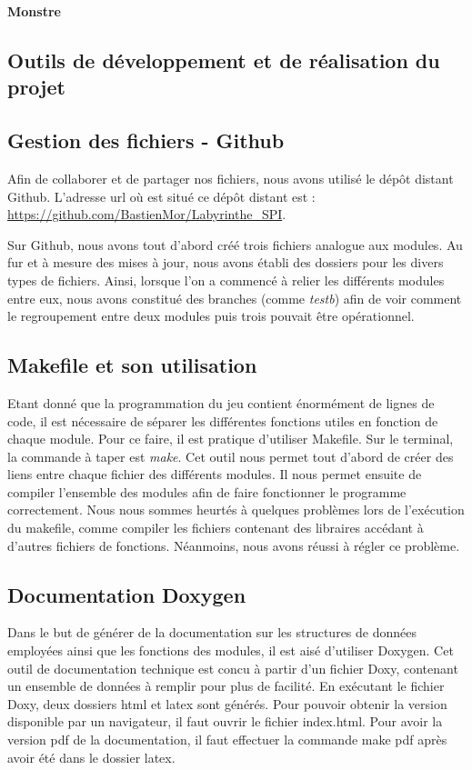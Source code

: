\documentclass[a4paper,11pt]{report}
\begin{document}
  		    \textbf{Monstre}
   		\begin{itemize}

  \chapter{Outils de développement et de réalisation du projet}
  \section{Gestion des fichiers - Github}
  Afin de collaborer et de partager nos fichiers, nous avons utilisé le dépôt distant Github. L'adresse url où est situé ce dépôt distant est : \url{https://github.com/BastienMor/Labyrinthe_SPI}.
  
  Sur Github, nous avons tout d'abord créé trois fichiers analogue aux modules. Au fur et à mesure des mises à jour, nous avons établi des dossiers pour les divers types de fichiers. Ainsi, lorsque l'on a commencé à relier les différents modules entre eux, nous avons constitué des branches (comme \textit{testb}) afin de voir comment le regroupement entre deux modules puis trois pouvait être opérationnel.
  \section{Makefile et son utilisation}
  	Etant donné que la programmation du jeu contient énormément de lignes de code, il est nécessaire de séparer les différentes fonctions utiles en fonction de chaque module. Pour ce faire, il est pratique d'utiliser Makefile. Sur le terminal, la commande à taper est \textit{make}.
	Cet outil nous permet tout d'abord de créer des liens entre chaque fichier des différents modules. Il nous permet ensuite de compiler l'ensemble des modules afin de faire fonctionner le programme correctement.
  	Nous nous sommes heurtés à quelques problèmes lors de l'exécution du makefile, comme compiler les fichiers contenant des libraires accédant à d'autres fichiers de fonctions. Néanmoins, nous avons réussi à régler ce problème.
  
 \section{Documentation Doxygen}
 	Dans le but de générer de la documentation sur les structures de données employées ainsi que les fonctions des modules, il est aisé d'utiliser Doxygen. Cet outil de documentation technique est concu à partir d'un fichier Doxy, contenant un ensemble de données à remplir pour plus de facilité.
  En exécutant le fichier Doxy, deux dossiers html et latex sont générés. Pour pouvoir obtenir la version disponible par un navigateur, il faut ouvrir le fichier index.html. Pour avoir la version pdf de la documentation, il faut effectuer la commande make pdf après avoir été dans le dossier latex. 

\end{itemize}
\end{document}
